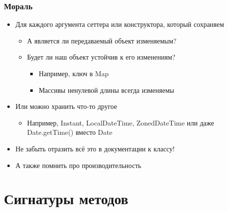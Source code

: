 \documentclass[xetex,mathserif,serif]{beamer}
\begin{document}
	\begin{frame}
		\frametitle{Мораль}
		\begin{itemize}
			\item Для каждого аргумента сеттера или конструктора, который сохраняем
			\begin{itemize}
				\item А является ли передаваемый объект изменяемым?
				\item Будет ли наш объект устойчив к его изменениям?
				\begin{itemize}
					\item Например, ключ в Map
					\item Массивы ненулевой длины всегда изменяемы
				\end{itemize}
			\end{itemize}
			\item Или можно хранить что-то другое
			\begin{itemize}
				\item Например, Instant, LocalDateTime, ZonedDateTime или даже Date.getTime() вместо Date
			\end{itemize}
			\item Не забыть отразить всё это в документации к классу!
			\item А также помнить про производительность
		\end{itemize}
	\end{frame}

	\section{Сигнатуры методов}
\end{document}
